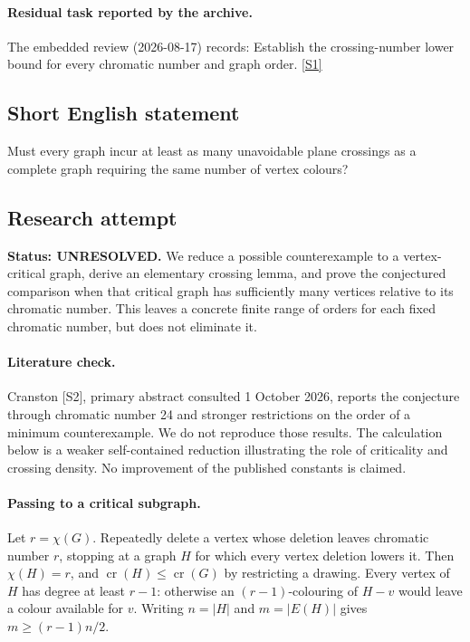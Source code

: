 \documentclass[11pt,a4paper]{article}
\newcommand{\sref}[2]{\hyperlink{source:#1:#2}{[S#2]}}
\begin{document}
\paragraph{Residual task reported by the archive.}

The embedded review (2026-08-17) records: Establish the crossing-number lower bound for every chromatic number and graph order. \sref{1402}{1}

\subsection{Short English statement}

Must every graph incur at least as many unavoidable plane crossings as a complete graph requiring the same number of vertex colours?

\subsection{Research attempt}
\textbf{Status: UNRESOLVED.} We reduce a possible counterexample to a vertex-critical graph, derive an elementary crossing lemma, and prove the conjectured comparison when that critical graph has sufficiently many vertices relative to its chromatic number. This leaves a concrete finite range of orders for each fixed chromatic number, but does not eliminate it.

\paragraph{Literature check.}
Cranston [S2], primary abstract consulted 1 October 2026, reports the conjecture through chromatic number 24 and stronger restrictions on the order of a minimum counterexample. We do not reproduce those results. The calculation below is a weaker self-contained reduction illustrating the role of criticality and crossing density. No improvement of the published constants is claimed.

\paragraph{Passing to a critical subgraph.}
Let $r=\chi(G)$. Repeatedly delete a vertex whose deletion leaves chromatic number $r$, stopping at a graph $H$ for which every vertex deletion lowers it. Then $\chi(H)=r$, and $\operatorname{cr}(H)\le\operatorname{cr}(G)$ by restricting a drawing. Every vertex of $H$ has degree at least $r-1$: otherwise an $(r-1)$-colouring of $H-v$ would leave a colour available for $v$. Writing $n=|H|$ and $m=|E(H)|$ gives $m\ge(r-1)n/2$.
\end{document}
